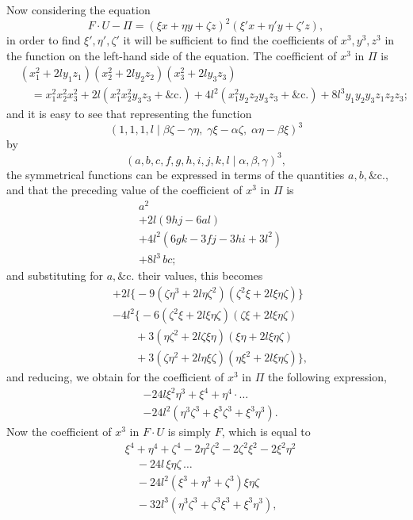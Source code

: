 \documentclass[11pt]{article}
\begin{document}
\medskip

Now considering the equation
\[
F \cdot U - \Pi = (\xi x + \eta y + \zeta z)^2 (\xi' x + \eta' y + \zeta' z),
\]
in order to find $\xi', \eta', \zeta'$ it will be sufficient to find the coefficients of $x^3, y^3, z^3$ in the function on the left-hand side of the equation. The coefficient of $x^3$ in $\Pi$ is
\begin{align*}
&(x_1^2 + 2 l y_1 z_1)(x_2^2 + 2 l y_2 z_2)(x_3^2 + 2 l y_3 z_3) \\
&\quad = x_1^2 x_2^2 x_3^2 + 2 l (x_1^2 x_2^2 y_3 z_3 + \&\text{c.}) + 4 l^2 (x_1^2 y_2 z_2 y_3 z_3 + \&\text{c.}) + 8 l^3 y_1 y_2 y_3 z_1 z_2 z_3;
\end{align*}
and it is easy to see that representing the function
\[
(1, 1, 1, l \mid \beta\zeta - \gamma\eta,\; \gamma\xi - \alpha\zeta,\; \alpha\eta - \beta\xi)^3
\]
by
\[
(a, b, c, f, g, h, i, j, k, l \mid \alpha, \beta, \gamma)^3,
\]
the symmetrical functions can be expressed in terms of the quantities $a, b, \&\text{c.}$, and that the preceding value of the coefficient of $x^3$ in $\Pi$ is
\begin{align*}
&a^2 \\
&+ 2 l(9 h j - 6 a l) \\
&+ 4 l^2 (6 g k - 3 f j - 3 h i + 3 l^2) \\
&+ 8 l^3\, b c;
\end{align*}
and substituting for $a, \&\text{c.}$ their values, this becomes
\begin{align*}
&+ 2 l \bigl\{-9(\zeta\eta^3 + 2 l \eta\zeta^2)(\zeta^2 \xi + 2 l \xi\eta\zeta)\bigr\} \\
&- 4 l^2 \bigl\{-6(\zeta^2 \xi + 2 l \xi\eta\zeta)(\zeta\xi + 2 l \xi\eta\zeta) \\
&\qquad + 3(\eta\zeta^2 + 2 l \zeta\xi\eta)(\xi\eta + 2 l \xi\eta\zeta) \\
&\qquad + 3(\zeta\eta^2 + 2 l \eta\xi\zeta)(\eta\xi^2 + 2 l \xi\eta\zeta)\bigr\},
\end{align*}
and reducing, we obtain for the coefficient of $x^3$ in $\Pi$ the following expression,
\begin{align*}
&-24 l \xi^2 \eta^3 + \xi^4 + \eta^4 \cdot\ldots \\
&-24 l^2 (\eta^3 \zeta^3 + \xi^3 \zeta^3 + \xi^3 \eta^3).
\end{align*}
Now the coefficient of $x^3$ in $F \cdot U$ is simply $F$, which is equal to
\begin{align*}
&\xi^4 + \eta^4 + \zeta^4 - 2\eta^2 \zeta^2 - 2\zeta^2 \xi^2 - 2\xi^2 \eta^2 \\
&\quad - 24 l\,\xi\eta\zeta\,\ldots \\
&\quad - 24 l^2 (\xi^3 + \eta^3 + \zeta^3)\xi\eta\zeta \\
&\quad - 32 l^3 (\eta^3 \zeta^3 + \zeta^3 \xi^3 + \xi^3 \eta^3),
\end{align*}
\end{document}
